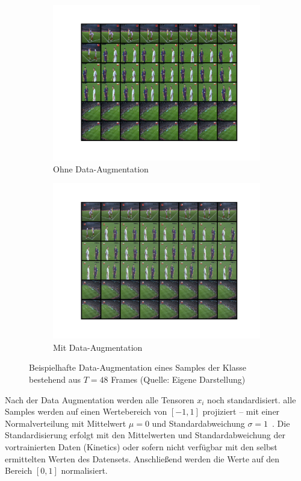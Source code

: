 \begin{figure}
    \centering
    \begin{subfigure}[b]{.49\textwidth}
        \centering
        \includegraphics[width=.95\linewidth, trim=0 80 0 80, clip]{img/05_sample_orig.png}
        \caption{Ohne Data-Augmentation}
    \end{subfigure}%
    \begin{subfigure}[b]{.49\textwidth}
        \centering
        \includegraphics[width=.95\linewidth, trim=0 80 0 80, clip]{img/05_sample_aug4.png}
        \caption{Mit Data-Augmentation}
    \end{subfigure}
    \caption[Beispielhafte Data-Augmentation eines Samples]{Beispielhafte Data-Augmentation eines Samples der Klasse  bestehend aus $T=48$ Frames (Quelle: Eigene Darstellung)}
    \label{fig:sample_example}
\end{figure}

Nach der Data Augmentation werden alle Tensoren $x_i$ noch standardisiert.
\Dh alle Samples werden auf einen Wertebereich von $\left[ -1, 1\right]$ projiziert -- mit einer Normalverteilung mit Mittelwert $\mu = 0$ und Standardabweichung $\sigma = 1$~\cite{Burkov19}.
Die Standardisierung erfolgt mit den Mittelwerten und Standardabweichung der vortrainierten Daten (\zB Kinetics) oder sofern nicht verfügbar mit den selbst ermittelten Werten des Datensets.
Anschließend werden die Werte auf den Bereich $\left[0, 1\right]$ normalisiert.
